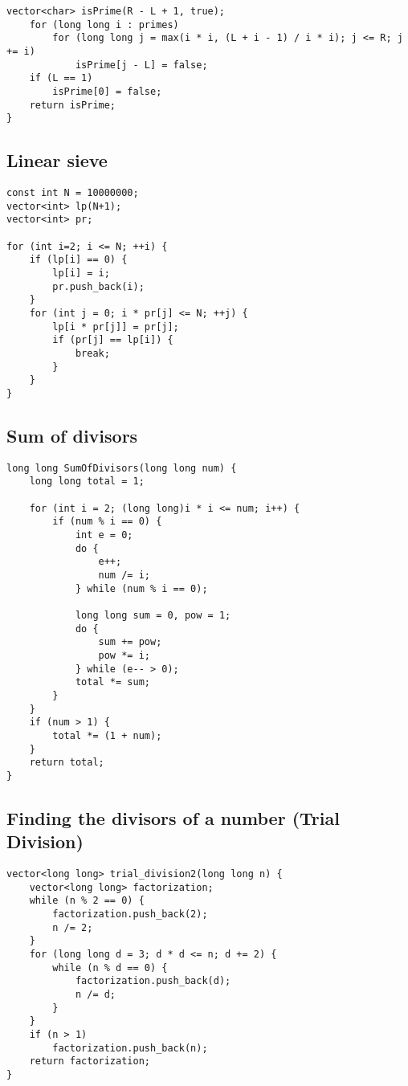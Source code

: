 \documentclass[10pt]{article}
\begin{document}
\begin{multicols*}{2}
\begin{lstlisting}[style=compactcpp]
    vector<char> isPrime(R - L + 1, true);
    for (long long i : primes)
        for (long long j = max(i * i, (L + i - 1) / i * i); j <= R; j += i)
            isPrime[j - L] = false;
    if (L == 1)
        isPrime[0] = false;
    return isPrime;
}
\end{lstlisting}
\subsection{Linear sieve}
\begin{lstlisting}[style=compactcpp]
const int N = 10000000;
vector<int> lp(N+1);
vector<int> pr;

for (int i=2; i <= N; ++i) {
    if (lp[i] == 0) {
        lp[i] = i;
        pr.push_back(i);
    }
    for (int j = 0; i * pr[j] <= N; ++j) {
        lp[i * pr[j]] = pr[j];
        if (pr[j] == lp[i]) {
            break;
        }
    }
}
\end{lstlisting}

\subsection{Sum of divisors}

\begin{lstlisting}[style=compactcpp]
long long SumOfDivisors(long long num) {
    long long total = 1;

    for (int i = 2; (long long)i * i <= num; i++) {
        if (num % i == 0) {
            int e = 0;
            do {
                e++;
                num /= i;
            } while (num % i == 0);

            long long sum = 0, pow = 1;
            do {
                sum += pow;
                pow *= i;
            } while (e-- > 0);
            total *= sum;
        }
    }
    if (num > 1) {
        total *= (1 + num);
    }
    return total;
}
\end{lstlisting}

\subsection{Finding the divisors of a number (Trial Division)}

\begin{lstlisting}[style=compactcpp]
vector<long long> trial_division2(long long n) {
    vector<long long> factorization;
    while (n % 2 == 0) {
        factorization.push_back(2);
        n /= 2;
    }
    for (long long d = 3; d * d <= n; d += 2) {
        while (n % d == 0) {
            factorization.push_back(d);
            n /= d;
        }
    }
    if (n > 1)
        factorization.push_back(n);
    return factorization;
}
\end{lstlisting}


\end{multicols*}
\end{document}
